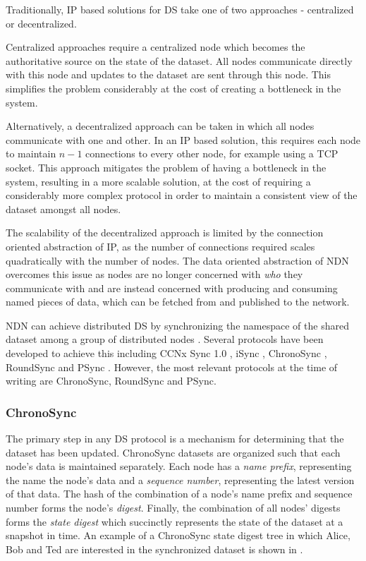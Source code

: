 Traditionally, IP based solutions for DS take one of two approaches - centralized or decentralized. 

Centralized approaches require a centralized node which becomes the authoritative source on the state of the dataset. All nodes communicate directly with this node and updates to the dataset are sent through this node. This simplifies the problem considerably at the cost of creating a bottleneck in the system.

Alternatively, a decentralized approach can be taken in which all nodes communicate with one and other. In an IP based solution, this requires each node to maintain $n-1$ connections to every other node, for example using a TCP socket. This approach mitigates the problem of having a bottleneck in the system, resulting in a more scalable solution, at the cost of requiring a considerably more complex protocol in order to maintain a consistent view of the dataset amongst all nodes.

The scalability of the decentralized approach is limited by the connection oriented abstraction of IP, as the number of connections required scales quadratically with the number of nodes. The data oriented abstraction of NDN overcomes this issue as nodes are no longer concerned with \textit{who} they communicate with and are instead concerned with producing and consuming named pieces of data, which can be fetched from and published to the network. 

NDN can achieve distributed DS by synchronizing the namespace of the shared dataset among a group of distributed nodes \cite{sync-survey}. Several protocols have been developed to achieve this including CCNx Sync 1.0 \cite{ccnx-sync}, iSync \cite{isync}, ChronoSync \cite{chronosync}, RoundSync \cite{roundsync} and PSync \cite{psync}. However, the most relevant protocols at the time of writing are ChronoSync, RoundSync and PSync.


\subsubsection*{ChronoSync}
The primary step in any DS protocol is a mechanism for determining that the dataset has been updated. ChronoSync datasets are organized such that each node's data is maintained separately. Each node has a \textit{name prefix}, representing the name the node's data and a \textit{sequence number}, representing the latest version of that data. The hash of the combination of a node's name prefix and sequence number forms the node's \textit{digest}. Finally, the combination of all nodes' digests forms the \textit{state digest} which succinctly represents the state of the dataset at a snapshot in time. An example of a ChronoSync state digest tree in which Alice, Bob and Ted are interested in the synchronized dataset is shown in .  

